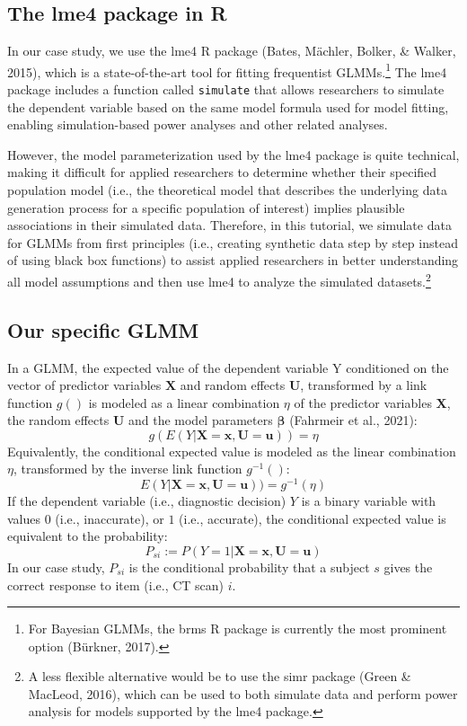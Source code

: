 \documentclass[
  man,floatsintext]{apa6}
\begin{document}
\hypertarget{the-lme4-package-in-r}{%
\subsection{The lme4 package in R}\label{the-lme4-package-in-r}}

In our case study, we use the lme4 R package (Bates, Mächler, Bolker, \& Walker, 2015), which is a state-of-the-art tool for fitting frequentist GLMMs.\footnote{For Bayesian GLMMs, the brms R package is currently the most prominent option (Bürkner, 2017).}
The lme4 package includes a function called \texttt{simulate} that allows researchers to simulate the dependent variable based on the same model formula used for model fitting, enabling simulation-based power analyses and other related analyses.

However, the model parameterization used by the lme4 package is quite technical, making it difficult for applied researchers to determine whether their specified population model (i.e., the theoretical model that describes the underlying data generation process for a specific population of interest) implies plausible associations in their simulated data. Therefore, in this tutorial, we simulate data for GLMMs from first principles (i.e., creating synthetic data step by step instead of using black box functions) to assist applied researchers in better understanding all model assumptions and then use lme4 to analyze the simulated datasets.\footnote{A less flexible alternative would be to use the simr package (Green \& MacLeod, 2016), which can be used to both simulate data and perform power analysis for models supported by the lme4 package.}

\hypertarget{our-specific-glmm}{%
\subsection{Our specific GLMM}\label{our-specific-glmm}}

In a GLMM, the expected value of the dependent variable Y conditioned on the vector of predictor variables \(\mathbf{X}\) and random effects \(\mathbf{U}\), transformed by a link function \(g()\) is modeled as a linear combination \(\eta\) of the predictor variables \(\mathbf{X}\), the random effects \(\mathbf{U}\) and the model parameters \(\mathbf{\beta}\) (Fahrmeir et al., 2021): \[
g(E(Y|\mathbf{X}=\mathbf{x},\mathbf{U}=\mathbf{u})) = \eta
\] Equivalently, the conditional expected value is modeled as the linear combination \(\eta\), transformed by the inverse link function \(g^{-1}()\): \[
E(Y|\mathbf{X}=\mathbf{x},\mathbf{U}=\mathbf{u})) = g^{-1}(\eta)
\] If the dependent variable (i.e., diagnostic decision) \(Y\) is a binary variable with values \(0\) (i.e., inaccurate), or \(1\) (i.e., accurate), the conditional expected value is equivalent to the probability: \[
P_{si} := P(Y = 1|\mathbf{X}=\mathbf{x},\mathbf{U}=\mathbf{u})
\] In our case study, \(P_{si}\) is the conditional probability that a subject \(s\) gives the correct response to item (i.e., CT scan) \(i\).
\end{document}
